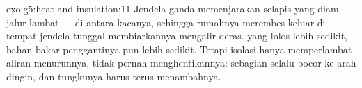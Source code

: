 \begin{solution}{exo:g5:heat-and-insulation:11}
Jendela ganda memenjarakan selapis  yang diam --- jalur lambat
--- di antara kacanya, sehingga  rumahnya merembes keluar di
tempat jendela tunggal membiarkannya mengalir deras.  yang lolos
lebih sedikit, bahan bakar penggantinya pun lebih sedikit. Tetapi
isolasi hanya memperlambat aliran menurunnya, tidak pernah
menghentikannya: sebagian  selalu bocor ke arah  dingin, dan
tungkunya harus terus menambahnya.
\end{solution}
